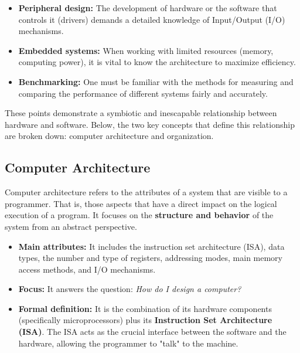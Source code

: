 \begin{itemize}
\begin{figure}[h!]
{
    }%
    \caption{Diagram of the 32-bit IEEE-754 floating-point format.}
    \label{fig:ieee754_format}
\end{figure}
    \item \textbf{Peripheral design:} The development of hardware or the software that controls it (drivers) demands a detailed knowledge of Input/Output (I/O) mechanisms.
    \item \textbf{Embedded systems:} When working with limited resources (memory, computing power), it is vital to know the architecture to maximize efficiency.
    \item \textbf{Benchmarking:} One must be familiar with the methods for measuring and comparing the performance of different systems fairly and accurately.
\end{itemize}

These points demonstrate a symbiotic and inescapable relationship between hardware and software. Below, the two key concepts that define this relationship are broken down: computer architecture and organization.

\subsection{Computer Architecture}
Computer architecture refers to the attributes of a system that are visible to a programmer. That is, those aspects that have a direct impact on the logical execution of a program. It focuses on the \textbf{structure and behavior} of the system from an abstract perspective.

\begin{itemize}
    \item \textbf{Main attributes:} It includes the instruction set architecture (ISA), data types, the number and type of registers, addressing modes, main memory access methods, and I/O mechanisms.
    \item \textbf{Focus:} It answers the question: \textit{How do I design a computer?} 
    \item \textbf{Formal definition:} It is the combination of its hardware components (specifically microprocessors) plus its \textbf{Instruction Set Architecture (ISA)}. The ISA acts as the crucial interface between the software and the hardware, allowing the programmer to "talk" to the machine.
\end{itemize}

